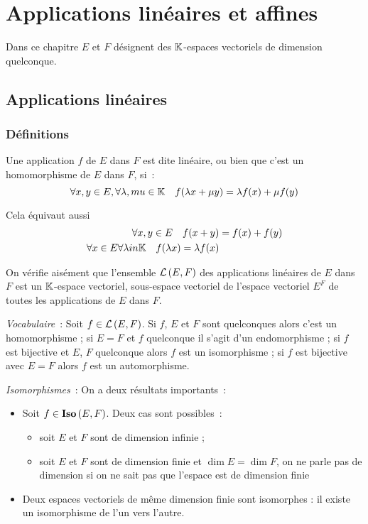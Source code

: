 \chapter{Applications linéaires et affines}
Dans ce chapitre $E$ et $F$ désignent des $\mathbb{K}$-espaces vectoriels de dimension quelconque.
\section{Applications linéaires}
\subsection{Définitions}
\begin{defdef}
Une application $f$ de $E$ dans $F$ est dite linéaire, ou bien que c'est un homomorphisme de $E$ dans $F$, si~:
\begin{equation}
\forall x,y \in E, \forall \lambda,mu \in \mathbb{K} \quad f(\lambda x + \mu y) = \lambda f(x)+\mu f(y)
\end{equation}
\end{defdef}
Cela équivaut aussi
\begin{align}
\forall x,y \in E \quad f(x+y) &= f(x)+f(y) \\
\forall x \in E \forall \lambda in \mathbb{K} \quad f(\lambda x)= \lambda f(x)
\end{align}

On vérifie aisément que l'ensemble $\mathcal{L}\left(E,F\right)$ des applications linéaires de $E$ dans $F$ est un $\mathbb{K}$-espace vectoriel, sous-espace vectoriel de l'espace vectoriel $E^F$ de toutes les applications de $E$ dans $F$.

\emph{Vocabulaire}~: Soit $f \in \mathcal{L}\left(E,F\right)$. Si $f$, $E$ et $F$ sont quelconques alors c'est un homomorphisme ; si $E=F$ et $f$ quelconque il s'agit d'un endomorphisme ; si $f$ est bijective et $E$, $F$ quelconque alors $f$ est un isomorphisme ; si $f$ est bijective avec $E=F$ alors $f$ est un automorphisme.

\emph{Isomorphismes}~: On a deux résultats importants~:
\begin{itemize}
\item Soit $f \in \mathbf{Iso}\left(E,F\right)$. Deux cas sont possibles~:
\begin{itemize}
\item soit $E$ et $F$ sont de dimension infinie ;
\item soit $E$ et $F$ sont de dimension finie et $\dim{E} = \dim{F}$, on ne parle pas de dimension si on ne sait pas que l'espace est de dimension finie
\end{itemize}
\item Deux espaces vectoriels de même dimension finie sont isomorphes : il existe un isomorphisme de l'un vers l'autre.
\end{itemize}

